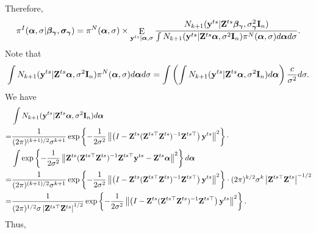 \documentclass[11pt]{article}
\DeclareMathOperator{\myE}{E}
\newcommand{\By}{\mathbf{y}}    \newcommand{\Bz}{\mathbf{z}}
\newcommand{\bfsym}[1]{\ensuremath{\boldsymbol{#1}}}
\def\balpha{\bfsym \alpha}
\def\bbeta{\bfsym \beta}
\def\bgamma{\bfsym \gamma}             \def\bGamma{\bfsym \Gamma}
\def\bsigma{\bfsym \sigma}             \def\bSigma{\bfsym \Sigma}
\theoremstyle{plain}
\theoremstyle{definition}
\theoremstyle{remark}
\begin{document}
Therefore, 
\begin{equation*}
    \pi^I (\balpha, \sigma | \bbeta_{\bgamma}, \bsigma_{\bgamma}) 
    =
    \pi^N (\balpha, \sigma ) 
    \times
    \myE_{\By^{ts}|\balpha, \sigma}
    \frac{N_{k+1} (\By^{ts} | \BZ^{ts} \bbeta_{\bgamma}, \sigma^2_{\bgamma} \BI_n)}{\int N_{k+1} (\By^{ts} | \BZ^{ts} \balpha, \sigma^2 \BI_n) \pi^N (\balpha, \sigma) d\balpha d \sigma}.
\end{equation*}
Note that
\begin{equation*}
    \int N_{k+1} (\By^{ts} | \BZ^{ts} \balpha, \sigma^2 \BI_n) \pi^N (\balpha, \sigma) d\balpha d \sigma
    =
    \int\left(\int N_{k+1} (\By^{ts} | \BZ^{ts} \balpha, \sigma^2 \BI_n)  d\balpha   \right) \frac{c}{\sigma^2} d \sigma.
\end{equation*}
We have
\begin{equation*}
    \begin{split}
    &\int N_{k+1} (\By^{ts} | \BZ^{ts} \balpha, \sigma^2 \BI_n)  d\balpha   
    \\
    =
    &
    \frac{1}{(2\pi)^{(k+1)/2} \sigma^{k+1}} \exp\left\{-\frac{1}{2\sigma^2} \left\|\left(I-\BZ^{ts} (\BZ^{ts\top} \BZ^{ts})^{-1}\BZ^{ts\top}\right)\By^{ts}\right\|^2\right\}
    \cdot
    \\
    &\int 
    \exp\left\{-\frac{1}{2\sigma^2} \left\|\BZ^{ts} (\BZ^{ts\top} \BZ^{ts})^{-1}\BZ^{ts\top}\By^{ts}-\BZ^{ts}\balpha\right\|^2\right\}
    d\balpha   
    \\
    =
    &
    \frac{1}{(2\pi)^{(k+1)/2} \sigma^{k+1}} \exp\left\{-\frac{1}{2\sigma^2} \left\|\left(I-\BZ^{ts} (\BZ^{ts\top} \BZ^{ts})^{-1}\BZ^{ts\top}\right)\By^{ts}\right\|^2\right\}
    \cdot
    (2\pi)^{k/2} \sigma^k \left| \BZ^{ts\top} \BZ^{ts} \right|^{-1/2}
    \\
    =
    &
    \frac{1}{(2\pi)^{1/2} \sigma \left| \BZ^{ts\top} \BZ^{ts} \right|^{1/2} } \exp\left\{-\frac{1}{2\sigma^2} \left\|\left(I-\BZ^{ts} (\BZ^{ts\top} \BZ^{ts})^{-1}\BZ^{ts\top}\right)\By^{ts}\right\|^2\right\}
    .
    \end{split}
\end{equation*}
Thus,
\end{document}

